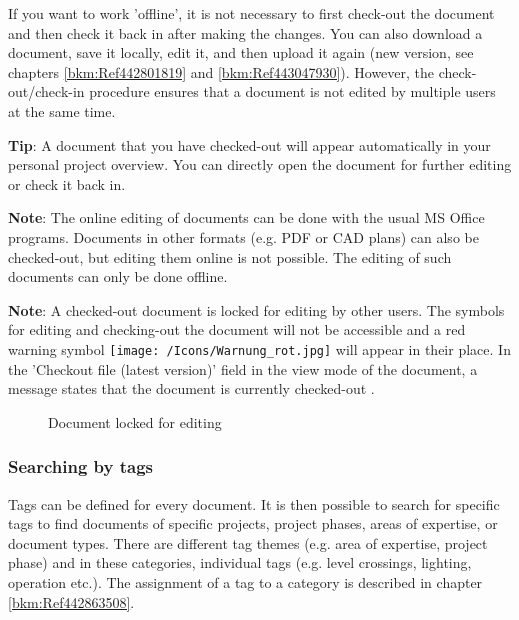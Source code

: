 If you want to work 'offline', it is not necessary to first check-out the document and then check it back in after making the changes. You can also download a document, save it locally, edit it, and then upload it again (new version, see chapters \ref{bkm:Ref442801819} and \ref{bkm:Ref443047930}). However, the check-out/check-in procedure ensures that a document is not edited by multiple users at the same time.

\vspace{\baselineskip}

\textbf{Tip}: A document that you have checked-out will appear automatically in your personal project overview. You can directly open the document for further editing or check it back in. \newline


\textbf{Note}: The online editing of documents can be done with the usual MS Office programs. Documents in other formats (e.g. PDF or CAD plans) can also be checked-out, but editing them online is not possible. The editing of such documents can only be done offline. \newline


\textbf{Note}: A checked-out document is locked for editing by other users. The symbols for editing and checking-out the document will not be accessible and a red warning symbol \texttt{[image: /Icons/Warnung\_rot.jpg]}  will appear in their place. In the 'Checkout file (latest version)' field in the view mode of the document, a message states that the document is currently checked-out .

\begin{figure}[H]
\caption{Document locked for editing}
\end{figure}

\subsubsection{Searching by tags}
\label{bkm:Ref442275849}

Tags can be defined for every document. It is then possible to search for specific tags to find documents of specific projects, project phases, areas of expertise, or document types. There are different tag themes (e.g. area of expertise, project phase) and in these categories, individual tags (e.g. level crossings, lighting, operation etc.). The assignment of a tag to a category is described in chapter \ref{bkm:Ref442863508}.

